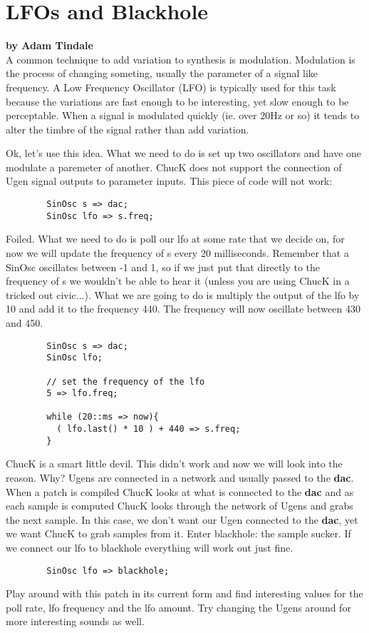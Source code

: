 \section{LFOs and Blackhole}
\textbf{by Adam Tindale}\\

A common technique to add variation to synthesis is modulation. Modulation is the process of changing someting, usually the parameter of a signal like frequency. A Low Frequency Oscillator (LFO) is typically used for this task because the variations are fast enough to be interesting, yet slow enough to be perceptable. When a signal is modulated quickly (ie. over 20Hz or so) it tends to alter the timbre of the signal rather than add variation. 

Ok, let's use this idea. What we need to do is set up two oscillators and have one modulate a paremeter of another. ChucK does not support the connection of Ugen signal outputs to parameter inputs. This piece of code will not work:

\begin{verbatim}
        SinOsc s => dac;
        SinOsc lfo => s.freq;
\end{verbatim}

Foiled. What we need to do is poll our lfo at some rate that we decide on, for now we will update the frequency of s every 20 milliseconds. Remember that a SinOsc oscillates between -1 and 1, so if we just put that directly to the frequency of s we wouldn't be able to hear it (unless you are using ChucK in a tricked out civic...). What we are going to do is multiply the output of the lfo by 10 and add it to the frequency 440. The frequency will now oscillate between 430 and 450. 

\begin{verbatim}
        SinOsc s => dac;
        SinOsc lfo;

        // set the frequency of the lfo
        5 => lfo.freq;
    
        while (20::ms => now){
          ( lfo.last() * 10 ) + 440 => s.freq;
        }
\end{verbatim}

ChucK is a smart little devil. This didn't work and now we will look into the reason. Why? Ugens are connected in a network and usually passed to the {\bf dac}. When a patch is compiled ChucK looks at what is connected to the {\bf dac} and as each sample is computed ChucK looks through the network of Ugens and grabs the next sample. In this case, we don't want our Ugen connected to the {\bf dac}, yet we want ChucK to grab samples from it. Enter blackhole: the sample sucker. If we connect our lfo to blackhole everything will work out just fine.

\begin{verbatim}
        SinOsc lfo => blackhole;
\end{verbatim}

Play around with this patch in its current form and find interesting values for the poll rate, lfo frequency and the lfo amount. Try changing the Ugens around for more interesting sounds as well. 

